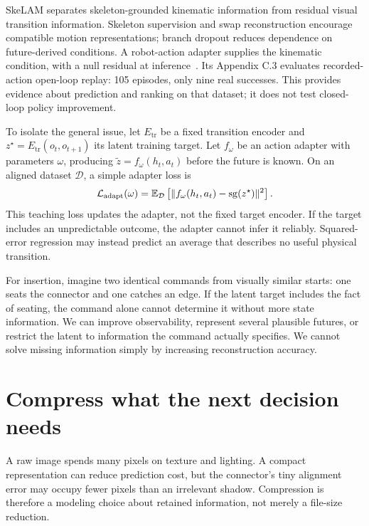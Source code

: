 SkeLAM separates skeleton-grounded kinematic information from residual visual transition information. Skeleton supervision and swap reconstruction encourage compatible motion representations; branch dropout reduces dependence on future-derived conditions. A robot-action adapter supplies the kinematic condition, with a null residual at inference~\citep[Sec.~3 and App.~B]{skelam}. Its Appendix C.3 evaluates recorded-action open-loop replay: 105 episodes, only nine real successes. This provides evidence about prediction and ranking on that dataset; it does not test closed-loop policy improvement.

To isolate the general issue, let $E_{\mathrm{tr}}$ be a fixed transition encoder and $z^\star=E_{\mathrm{tr}}(o_t,o_{t+1})$ its latent training target. Let $f_\omega$ be an action adapter with parameters $\omega$, producing $\widetilde z=f_\omega(h_t,a_t)$ before the future is known. On an aligned dataset $\mathcal D$, a simple adapter loss is
\begin{equation}
 \mathcal L_{\mathrm{adapt}}(\omega)
 =\mathbb{E}_{\mathcal D}\left[\|f_\omega(h_t,a_t)-\operatorname{sg}(z^\star)\|^2\right].
 \label{eq:middle-adapter}
\end{equation}
This teaching loss updates the adapter, not the fixed target encoder. If the target includes an unpredictable outcome, the adapter cannot infer it reliably. Squared-error regression may instead predict an average that describes no useful physical transition.

For insertion, imagine two identical commands from visually similar starts: one seats the connector and one catches an edge. If the latent target includes the fact of seating, the command alone cannot determine it without more state information. We can improve observability, represent several plausible futures, or restrict the latent to information the command actually specifies. We cannot solve missing information simply by increasing reconstruction accuracy.


\section{Compress what the next decision needs}
A raw image spends many pixels on texture and lighting. A compact representation can reduce prediction cost, but the connector's tiny alignment error may occupy fewer pixels than an irrelevant shadow. Compression is therefore a modeling choice about retained information, not merely a file-size reduction.

